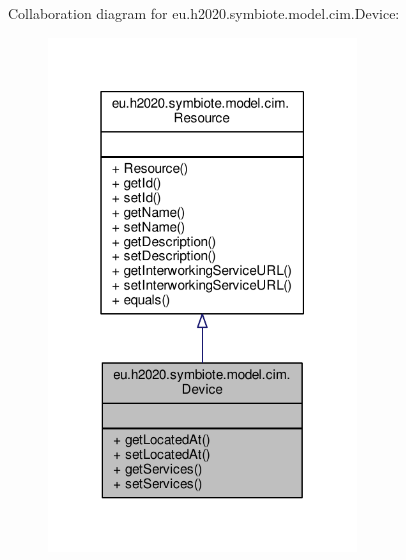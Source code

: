 Collaboration diagram for eu.\+h2020.\+symbiote.\+model.\+cim.\+Device\+:\nopagebreak
\begin{figure}[H]
\begin{center}
\leavevmode
\includegraphics[width=232pt]{classeu_1_1h2020_1_1symbiote_1_1model_1_1cim_1_1Device__coll__graph}
\end{center}
\end{figure}
